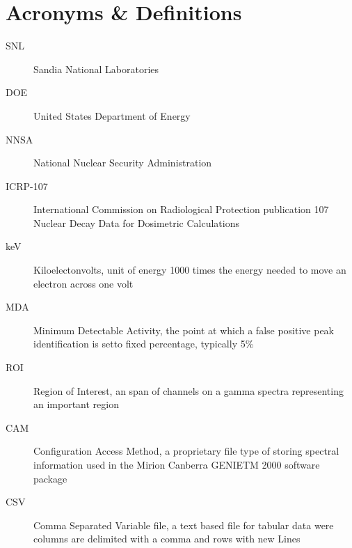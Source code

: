 \documentclass[12pt,report,justified]{SANDreport}
\begin{document}
    \chapter*{Acronyms \& Definitions}
    \begin{description}
	\item[SNL]
	     Sandia National Laboratories
	\item[DOE]
	     United States Department of Energy
	\item[NNSA]
	     National Nuclear Security Administration
          \item[ICRP-107]
	     International Commission on Radiological Protection publication 107 Nuclear Decay Data for Dosimetric Calculations
	\item[keV]
	     Kiloelectonvolts, unit of energy 1000 times the energy needed to move an electron across one volt
	\item[MDA]
	     Minimum Detectable Activity, the point at which a false positive peak identification is setto fixed percentage, typically 5\%
	\item[ROI]
	     Region of Interest, an span of channels on a gamma spectra representing an important region
	\item[CAM]
	     Configuration Access Method, a proprietary file type of storing spectral information used in the Mirion Canberra GENIETM 2000 software package
	\item[CSV]
	     Comma Separated Variable file, a text based file for tabular data were columns are delimited with a comma and rows with new Lines
    \end{description}


    \SANDmain		%
\end{document}
